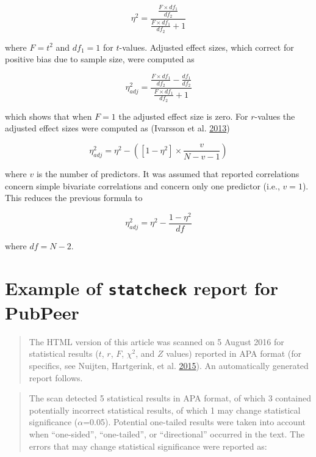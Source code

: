 \documentclass[a5paper]{book}
\begin{document}
\begin{equation}
\eta^2=\frac{\frac{F\times df_1}{df_2}}{\frac{F\times df_1}{df_2}+1}
\label{eq:b1}
\end{equation}

where \(F=t^2\) and \(df_1=1\) for \(t\)-values. Adjusted effect sizes,
which correct for positive bias due to sample size, were computed as

\begin{equation}
\eta^2_{adj}=\frac{\frac{F\times df_1}{df_2}-\frac{df_1}{df_2}}{\frac{F\times df_1}{df_2}+1}
\label{eq:b2}
\end{equation}

which shows that when \(F=1\) the adjusted effect size is zero. For
\(r\)-values the adjusted effect sizes were computed as (Ivarsson et al.
\protect\hyperlink{ref-doi:10.1016ux2fj.psychsport.2012.07.007}{2013})

\begin{equation}
\eta^2_{adj}=\eta^2-([1-\eta^2]\times\frac{v}{N-v-1})
\label{eq:b3}
\end{equation}

where \(v\) is the number of predictors. It was assumed that reported
correlations concern simple bivariate correlations and concern only one
predictor (i.e., \(v=1\)). This reduces the previous formula to

\begin{equation}
\eta^2_{adj}=\eta^2-\frac{1-\eta^2}{df}
\label{eq:b4}
\end{equation}

where \(df=N-2\).

\chapter{\texorpdfstring{Example of \texttt{statcheck} report for
PubPeer}{Example of statcheck report for PubPeer}}\label{example-of-statcheck-report-for-pubpeer}

\begin{quote}
The HTML version of this article was scanned on 5 August 2016 for
statistical results (\(t\), \(r\), \(F\), \(\chi^2\), and \(Z\) values)
reported in APA format (for specifics, see Nuijten, Hartgerink, et al.
\protect\hyperlink{ref-doi:10.3758ux2fs13428-015-0664-2}{2015}). An
automatically generated report follows.
\end{quote}

\begin{quote}
The scan detected 5 statistical results in APA format, of which 3
contained potentially incorrect statistical results, of which 1 may
change statistical significance (\(\alpha\)=0.05). Potential one-tailed
results were taken into account when \enquote{one-sided},
\enquote{one-tailed}, or \enquote{directional} occurred in the text. The
errors that may change statistical significance were reported as:
\end{quote}
\end{document}
